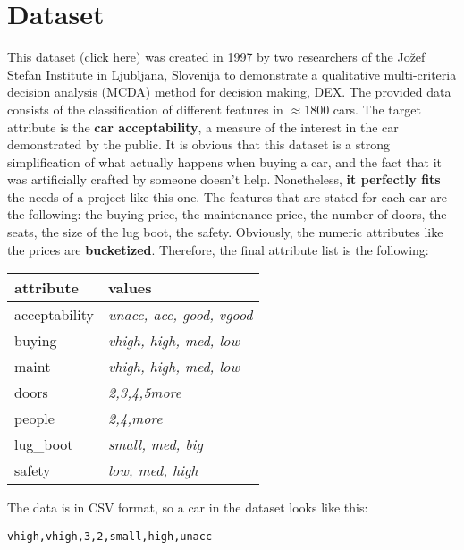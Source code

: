 \section{Dataset}
\label{sec:dataset}
This dataset \href{https://archive.ics.uci.edu/ml/datasets/Car+Evaluation}{(click here)} was created in 1997 by two researchers of the Jožef Stefan Institute in Ljubljana, Slovenija to demonstrate a qualitative multi-criteria decision analysis (MCDA) method for decision making, DEX. The provided data consists of the classification of different features in $\approx 1800$ cars. The target attribute is the \textbf{car acceptability}, a measure of the interest in the car demonstrated by the public. It is obvious that this dataset is a strong simplification of what actually happens when buying a car, and the fact that it was artificially crafted by someone doesn't help. Nonetheless, \textbf{it perfectly fits} the needs of a project like this one. The features that are stated for each car are the following: the buying price, the maintenance price, the number of doors, the seats, the size of the lug boot, the safety. Obviously, the numeric attributes like the prices are \textbf{bucketized}. Therefore, the final attribute list is the following:
\begin{center}
\begin{tabular}{|l|l|}
\hline
\textbf{attribute} & \textbf{values}\\
\hline
acceptability & \textit{unacc, acc, good, vgood}\\
\hline
buying & \textit{vhigh, high, med, low}\\
\hline
maint & \textit{vhigh, high, med, low}\\
\hline
doors & \textit{2,3,4,5more}\\
\hline
people & \textit{2,4,more}\\
\hline
lug\_boot & \textit{small, med, big}\\
\hline
safety & \textit{low, med, high}\\
\hline
\end{tabular}
\end{center}
The data is in CSV format, so a car in the dataset looks like this:
\begin{center}
    \texttt{vhigh,vhigh,3,2,small,high,unacc}
\end{center}